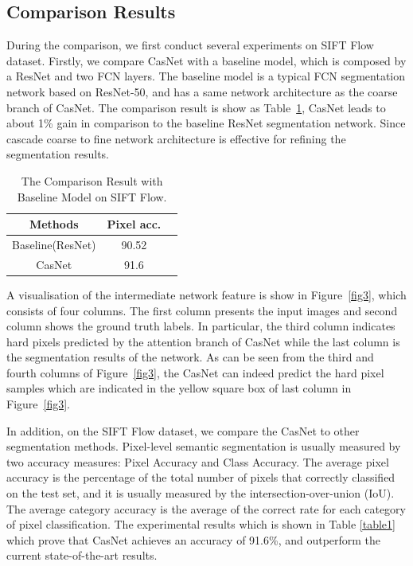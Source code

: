 \documentclass[10.5pt,compsoc]{TsT}
\theoremstyle{mystyle}
\begin{document}
{\subsection{Comparison Results}
\noindent

During the comparison, we first conduct several experiments on SIFT Flow dataset.
Firstly, we compare CasNet with a baseline model, which is composed by a ResNet and two FCN layers. The baseline model is a  typical FCN segmentation network based on ResNet-50, and has a same network architecture as the coarse branch of CasNet. The comparison result is show as Table~\ref{t:self1}, CasNet leads to about 1\% gain in comparison to the baseline ResNet segmentation network. Since cascade coarse to fine network architecture is effective for refining the segmentation results.

\begin{table}[h]
\large
\setlength{\belowcaptionskip}{12pt}
\caption{The Comparison Result with Baseline Model on SIFT Flow.}
\label{t:self1}
\centering
\begin{tabular}{ccc}
\hline 
Methods & Pixel acc. \\
\hline
Baseline(ResNet) & 90.52 \\
CasNet & 91.6  \\
\hline
\end{tabular}
\end{table}

A visualisation of the intermediate network feature is show in Figure~\ref{fig3}, which consists of four columns. The first column presents the input images and second column shows the ground truth labels. In particular, the third column indicates hard pixels predicted by the attention branch of CasNet while the last column is the segmentation results of the network. As can be seen from the third and fourth columns of Figure~\ref{fig3}, the CasNet can indeed predict the hard pixel samples which are indicated in the yellow square box of last column in Figure~\ref{fig3}.

In addition, on the SIFT Flow dataset, we compare the CasNet to other segmentation methods. Pixel-level semantic segmentation is usually measured by two accuracy measures: Pixel Accuracy and Class Accuracy. The average pixel accuracy is the percentage of the total number of pixels that correctly classified on the test set, and it is usually measured by the intersection-over-union (IoU). The average category accuracy is the average of the correct rate for each category of pixel classification. The experimental results which is shown in Table \ref{table1} which prove that CasNet achieves an accuracy of 91.6\%, and outperform the current state-of-the-art results.

}
\end{document}
